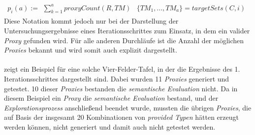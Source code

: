\begin{gather*}
p_i(a) := \begin{array}{l|l}
\sum_{k=1}^{a}\mathit{proxyCount(R,TM)} & \{\mathit{TM_1},...,\mathit{TM_a}\} = \mathit{targetSets(C,i)}  
\end{array}
\end{gather*}
\noindent
Diese Notation kommt jedoch nur bei der Darstellung der Untersuchungsergebnisse eines Iterationsschrittes zum Einsatz, in dem ein valider \emph{Proxy} gefunden wird. Für alle anderen Durchläufe ist die Anzahl der möglichen \emph{Proxies} bekannt und wird somit auch explizit dargestellt. 
\\\\
 zeigt ein Beispiel für eine solche Vier-Felder-Tafel, in der die Ergebnisse des 1. Iterationsschrittes dargestellt sind. Dabei wurden 11 \emph{Proxies} generiert und getestet. 10 dieser \emph{Proxies} bestanden die \emph{semantische Evaluation} nicht. Da in diesem Beispiel ein \emph{Proxy} die \emph{semantische Evaluation} bestand, und der \emph{Explorationsprozess} anschließend beendet wurde, mussten die übrigen \emph{Proxies}, die auf Basis der insgesamt 20 Kombinationen von \emph{provided Typen} hätten erzeugt werden können, nicht generiert und damit auch nicht getestet werden.


